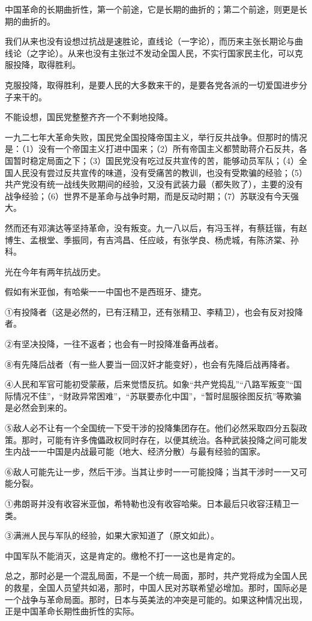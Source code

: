中国革命的长期曲折性，第一个前途，它是长期的曲折的；第二个前途，则更是长期的曲折的。

我们从来也没有设想过抗战是速胜论，直线论（一字论），而历来主张长期论与曲线论（之字论）。从来也没有主张过不发动全国人民，不实行国家民主化，可以克服投降，取得胜利。

克服投降，取得胜利，是要人民的大多数来干的，是要各党各派的一切爱国进步分子来干的。

不能设想，国民党整整齐齐一个不剩地投降。

一九二七年大革命失败，国民党全国投降帝国主义，举行反共战争。但那时的情况是：（1）没有一个帝国主义打进中国来；（2）所有帝国主义都赞助蒋介石反共，各国暂时稳定局面之下；（3）国民党没有吃过反共宣传的苦，能够动员军队；（4）全国人民没有尝过反共宣传的味道，没有受痛苦的教训，也没有受欺骗的经验；（5）共产党没有统一战线失败期间的经验，又没有武装力最（都失败了），主要的没有战争经验；（6）世界不是革命与战争时期，而是反动时期；（7）苏联没有今天强大。

然而还有邓演达等坚持革命，没有叛变。九一八以后，有冯玉祥，有蔡廷锴，有赵博生、孟根堂、季振同，有吉鸿昌、任应岐，有张学良、杨虎城，有陈济棠、孙科。

光在今年有两年抗战历史。

假如有米亚伽，有哈柴一一中国也不是西班牙、捷克。

①有投降者（这是必然的，已有汪精卫，还有张精卫、李精卫），也会有反对投降者。

②有坚决投降，一往不返者；也会有一时投降准备再战者。

⑧有先降后战者（有一些人要当一回汉奸才能变好），也会有先降后战再降者。

④人民和军官可能初受蒙蔽，后来觉悟反抗。如象“共产党捣乱”“八路军叛变”“国际情况不佳”，“财政异常困难”，“苏联要赤化中国”，“暂时屈服徐图反抗”等欺骗是必然会到来的。

⑤敌人必不让有一个全国统一下受干涉的投降集团存在。他们必然采取四分五裂政策。那时，可能有许多傀儡政权同时存在，以便其统治。各种武装投降之间可能发生内战一一中国是内战最可能（地大、经济分散）与最有经验的国家。

⑥敌人可能先让一步，然后干涉。当其让步时一一可能投降；当其干涉时一一又可能分裂。

①弗朗哥并没有收容米亚伽，希特勒也没有收容哈柴。日本最后只收容汪精卫一类。

③满洲人民与军队的经验，如果大家知道了（原文如此）。

中国军队不能消灭，这是肯定的。缴枪不打一一这也是肯定的。

总之，那时必是一个混乱局面，不是一个统一局面，那时，共产党将成为全国人民的救星，全国人员望共如渴，那时，中国人民对苏联希望必增加。那时，国际必是一个战争与革命局面。那时，日本与英美法的冲突是可能的。如果这种情况出现，正是中国革命长期性曲折性的实际。

